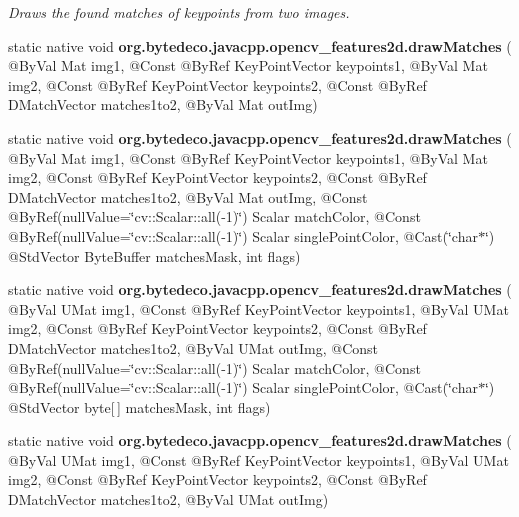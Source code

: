 \begin{DoxyCompactItemize}
\begin{DoxyCompactList}\small\item\em Draws the found matches of keypoints from two images. \end{DoxyCompactList}\item 
\mbox{\label{group__features2d__draw_ga0fa490aab35ddb31aa026268fc47ea13}} 
static native void {\bfseries org.\+bytedeco.\+javacpp.\+opencv\+\_\+features2d.\+draw\+Matches} ( @By\+Val Mat img1, @Const @By\+Ref Key\+Point\+Vector keypoints1, @By\+Val Mat img2, @Const @By\+Ref Key\+Point\+Vector keypoints2, @Const @By\+Ref D\+Match\+Vector matches1to2, @By\+Val Mat out\+Img)
\item 
\mbox{\label{group__features2d__draw_ga05c394d1f12608d241319daa6fa22089}} 
static native void {\bfseries org.\+bytedeco.\+javacpp.\+opencv\+\_\+features2d.\+draw\+Matches} ( @By\+Val Mat img1, @Const @By\+Ref Key\+Point\+Vector keypoints1, @By\+Val Mat img2, @Const @By\+Ref Key\+Point\+Vector keypoints2, @Const @By\+Ref D\+Match\+Vector matches1to2, @By\+Val Mat out\+Img, @Const @By\+Ref(null\+Value=\char`\"{}cv\+::\+Scalar\+::all(-\/1)\char`\"{}) Scalar match\+Color, @Const @By\+Ref(null\+Value=\char`\"{}cv\+::\+Scalar\+::all(-\/1)\char`\"{}) Scalar single\+Point\+Color, @Cast(\char`\"{}char$\ast$\char`\"{}) @Std\+Vector Byte\+Buffer matches\+Mask, int flags)
\item 
\mbox{\label{group__features2d__draw_gacf3335a0fdfedc2dcb6cc349c636e80e}} 
static native void {\bfseries org.\+bytedeco.\+javacpp.\+opencv\+\_\+features2d.\+draw\+Matches} ( @By\+Val U\+Mat img1, @Const @By\+Ref Key\+Point\+Vector keypoints1, @By\+Val U\+Mat img2, @Const @By\+Ref Key\+Point\+Vector keypoints2, @Const @By\+Ref D\+Match\+Vector matches1to2, @By\+Val U\+Mat out\+Img, @Const @By\+Ref(null\+Value=\char`\"{}cv\+::\+Scalar\+::all(-\/1)\char`\"{}) Scalar match\+Color, @Const @By\+Ref(null\+Value=\char`\"{}cv\+::\+Scalar\+::all(-\/1)\char`\"{}) Scalar single\+Point\+Color, @Cast(\char`\"{}char$\ast$\char`\"{}) @Std\+Vector byte\mbox{[}$\,$\mbox{]} matches\+Mask, int flags)
\item 
\mbox{\label{group__features2d__draw_ga2b2c2e3b61f07cd7e26bebe796dd0090}} 
static native void {\bfseries org.\+bytedeco.\+javacpp.\+opencv\+\_\+features2d.\+draw\+Matches} ( @By\+Val U\+Mat img1, @Const @By\+Ref Key\+Point\+Vector keypoints1, @By\+Val U\+Mat img2, @Const @By\+Ref Key\+Point\+Vector keypoints2, @Const @By\+Ref D\+Match\+Vector matches1to2, @By\+Val U\+Mat out\+Img)

\end{DoxyCompactItemize}
